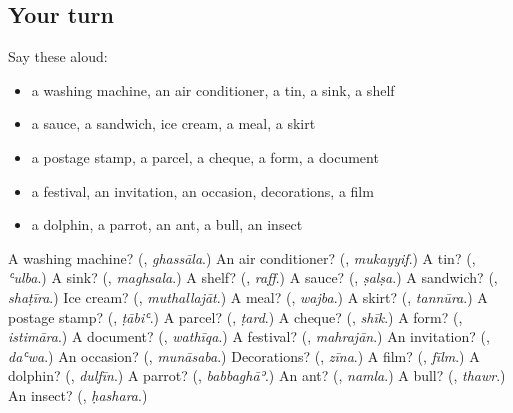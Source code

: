 \subsection*{Your turn}
Say these aloud:

\begin{itemize}
\raggedright
  \item a washing machine, an air conditioner, a tin, a sink, a shelf
  \item a sauce, a sandwich, ice cream, a meal, a skirt
  \item a postage stamp, a parcel, a cheque, a form, a document
  \item a festival, an invitation, an occasion, decorations, a film
  \item a dolphin, a parrot, an ant, a bull, an insect
\end{itemize}

\begin{tcolorbox}[breakable,colback=teal!4,colframe=teal!35!black,title={Before you move on}]
A washing machine? (\textbf{}, \emph{ghassāla}.) An air conditioner? (\textbf{}, \emph{mukayyif}.) A tin? (\textbf{}, \emph{ʿulba}.) A sink? (\textbf{}, \emph{maghsala}.) A shelf? (\textbf{}, \emph{raff}.) A sauce? (\textbf{}, \emph{ṣalṣa}.) A sandwich? (\textbf{}, \emph{shaṭīra}.) Ice cream? (\textbf{}, \emph{muthallajāt}.) A meal? (\textbf{}, \emph{wajba}.) A skirt? (\textbf{}, \emph{tannūra}.) A postage stamp? (\textbf{}, \emph{ṭābiʿ}.) A parcel? (\textbf{}, \emph{ṭard}.) A cheque? (\textbf{}, \emph{shīk}.) A form? (\textbf{}, \emph{istimāra}.) A document? (\textbf{}, \emph{wathīqa}.) A festival? (\textbf{}, \emph{mahrajān}.) An invitation? (\textbf{}, \emph{daʿwa}.) An occasion? (\textbf{}, \emph{munāsaba}.) Decorations? (\textbf{}, \emph{zīna}.) A film? (\textbf{}, \emph{fīlm}.) A dolphin? (\textbf{}, \emph{dulfīn}.) A parrot? (\textbf{}, \emph{babbaghāʾ}.) An ant? (\textbf{}, \emph{namla}.) A bull? (\textbf{}, \emph{thawr}.) An insect? (\textbf{}, \emph{ḥashara}.)
\end{tcolorbox}
